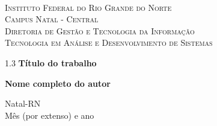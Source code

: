 
\begin{titlepage}
	\begin{center}
		
		  
		\begin{minipage}{11.15cm}
			\begin{center}
				\begin{espacosimples}
					{\small \ \\
                       \textsc{Instituto Federal do Rio Grande do Norte}
                       \\
							  \textsc{Campus Natal - Central}					\\
							  \textsc{Diretoria de Gestão e Tecnologia da Informação}	   
							  \\
							  \textsc{Tecnologia em Análise e Desenvolvimento de Sistemas}}   	
                       \\
				\end{espacosimples}
			\end{center}
		\end{minipage}

			
		\vspace{6cm}
						
		{\setlength{\baselineskip}%
		{1.3\baselineskip}
		{\LARGE \textbf{Título do trabalho}}\par}
			
		\vspace{3cm}
			
		{\large \textbf{Nome completo do autor}}
						
		\vspace{6cm}
		
		Natal-RN\\Mês (por extenso) e ano
	\end{center}
\end{titlepage}